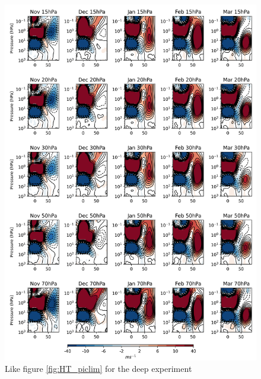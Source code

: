 \begin{figure}[h!]
\begin{center}
\noindent\includegraphics[width = 0.8\linewidth]{Figures/Figures-deepQBO/ZMZW_composites_by_month_QBO_phases_U_d_higher_MarQBO_vs_Mar_70hPa_5thresh.png}
\caption[ZMZW composites under different QBO phases in the deep QBO simulation]{Like figure \ref{fig:HT_piclim} for the deep experiment}
\label{fig:HT_deep}
\end{center}
\end{figure}

